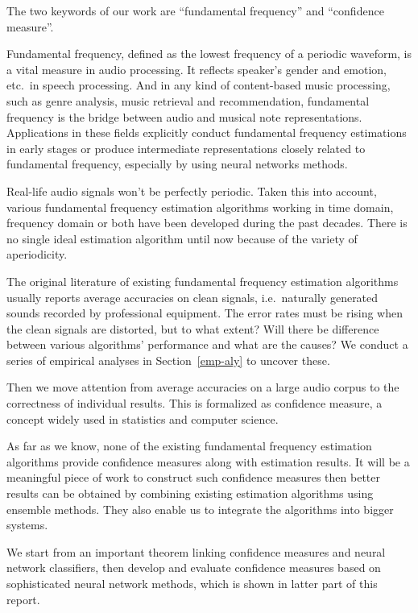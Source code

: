 \documentclass[11pt,a4paper]{report}
\begin{document}
The two keywords of our work are \enquote{fundamental frequency} and \enquote{confidence measure}.

\bigskip

Fundamental frequency, defined as the lowest frequency of a periodic waveform, is a vital measure in audio processing.
It reflects speaker's gender and emotion, etc.\ in speech processing.
And in any kind of content-based music processing, such as genre analysis, music retrieval and recommendation, fundamental frequency is the bridge between audio and musical note representations.
Applications in these fields explicitly conduct fundamental frequency estimations in early stages or produce intermediate representations closely related to fundamental frequency, especially by using neural networks methods.

Real-life audio signals won't be perfectly periodic.
Taken this into account, various fundamental frequency estimation algorithms working in time domain, frequency domain or both have been developed during the past decades.
There is no single ideal estimation algorithm until now because of the variety of aperiodicity.

The original literature of existing fundamental frequency estimation algorithms usually reports average accuracies on clean signals, i.e.\ naturally generated sounds recorded by professional equipment.
The error rates must be rising when the clean signals are distorted, but to what extent? Will there be difference between various algorithms' performance and what are the causes? We conduct a series of empirical analyses in Section~\ref{emp-aly} to uncover these.

\bigskip

Then we move attention from average accuracies on a large audio corpus to the correctness of individual results.
This is formalized as confidence measure, a concept widely used in statistics and computer science.

As far as we know, none of the existing fundamental frequency estimation algorithms provide confidence measures along with estimation results.
It will be a meaningful piece of work to construct such confidence measures then better results can be obtained by combining existing estimation algorithms using ensemble methods.
They also enable us to integrate the algorithms into bigger systems.

We start from an important theorem linking confidence measures and neural network classifiers, then develop and evaluate confidence measures based on sophisticated neural network methods, which is shown in latter part of this report.
\end{document}

